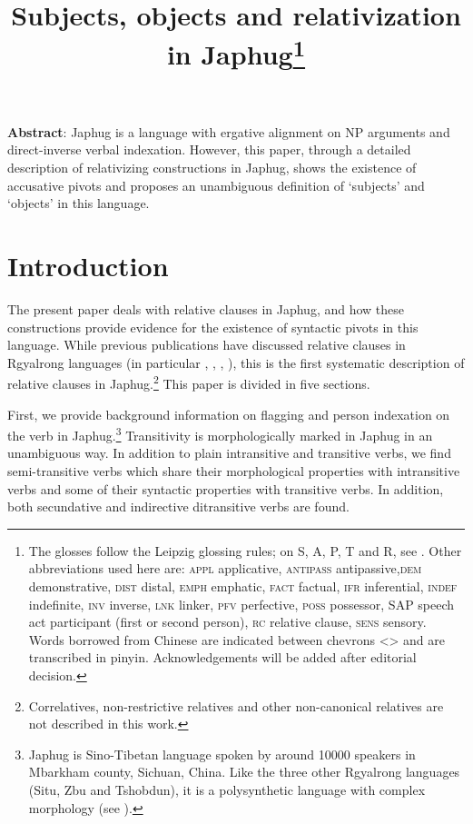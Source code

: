\documentclass[oldfontcommands,oneside,a4paper,11pt]{article}
\begin{document}
 
\title{Subjects, objects  and relativization in Japhug\footnote{
The glosses follow the Leipzig glossing rules; on S, A, P, T and R, see \citet{haspelmath11SAPTR}. Other abbreviations used here are: \textsc{appl} applicative, \textsc{antipass} antipassive,\textsc{dem} demonstrative, \textsc{dist} distal, \textsc{emph} emphatic, \textsc{fact} factual, \textsc{ifr} inferential, \textsc{indef} indefinite, \textsc{inv} inverse,  \textsc{lnk} linker, \textsc{pfv} perfective, \textsc{poss} possessor, SAP speech act participant (first or second person), \textsc{rc} relative clause, \textsc{sens} sensory. Words borrowed from Chinese are indicated between chevrons <> and are transcribed in pinyin. %
Acknowledgements will be added after editorial decision. %
} }
\maketitle
\linenumbers

\textbf{Abstract}: Japhug is a language with ergative alignment on NP arguments and direct-inverse verbal indexation. However, this paper, through  a detailed description of relativizing constructions in Japhug, shows the existence of accusative pivots and proposes an unambiguous definition of `subjects' and `objects' in this language. 


\section{Introduction}
The present paper deals with relative clauses in Japhug, and how these constructions provide evidence for the existence of syntactic pivots in this language. While previous publications have discussed relative clauses in Rgyalrong languages (in particular \citealt{jackson06guanxiju}, \citealt{jacksonlin07}, \citealt{jacques08zh}, \citealt{prins11kyomkyo}), this is the first systematic description of relative clauses in Japhug.\footnote{Correlatives, non-restrictive relatives and other non-canonical relatives are not described in this work.} This paper is divided in five sections.

First, we provide background information on flagging and person indexation on the verb in Japhug.\footnote{Japhug is Sino-Tibetan language spoken by around 10000 speakers in Mbarkham county, Sichuan, China. Like the three other Rgyalrong languages (Situ, Zbu and Tshobdun), it is a polysynthetic language with complex morphology (see \citealt{jacques14antipassive}). }  Transitivity is morphologically marked in Japhug in an unambiguous way. In addition to plain intransitive  and transitive verbs, we find  semi-transitive verbs which share their morphological properties with intransitive verbs and some of their syntactic properties with transitive verbs. In addition,  both secundative and indirective ditransitive verbs are found.
\end{document}
